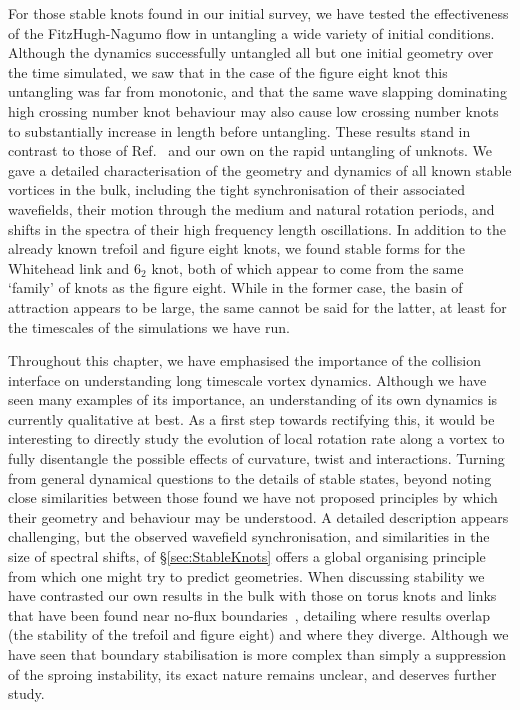 For those stable knots found in our initial survey, we have tested the effectiveness of the FitzHugh-Nagumo flow in untangling a wide variety of initial conditions. Although the dynamics successfully untangled all but one initial geometry over the time simulated, we saw that in the case of the figure eight knot this untangling was far from monotonic, and that the same wave slapping dominating high crossing number knot behaviour may also cause low crossing number knots to substantially increase in length before untangling. These results stand in contrast to those of Ref.~\citep{Maucher2016} and our own on the rapid untangling of unknots. We gave a detailed characterisation of the geometry and dynamics of all known stable vortices in the bulk, including the tight synchronisation of their associated wavefields, their motion through the medium and natural rotation periods, and shifts in the spectra of their high frequency length oscillations. In addition to the already known trefoil and figure eight knots, we found stable forms for the Whitehead link and $6_2$ knot, both of which appear to come from the same `family' of knots as the figure eight. While in the former case, the basin of attraction appears to be large, the same cannot be said for the latter, at least for the timescales of the simulations we have run. 

Throughout this chapter, we have emphasised the importance of the collision interface on understanding long timescale vortex dynamics. Although we have seen many examples of its importance, an understanding of its own dynamics is currently qualitative at best. As a first step towards rectifying this, it would be interesting to directly study the evolution of local rotation rate along a vortex to fully disentangle the possible effects of curvature, twist and interactions. Turning from general dynamical questions to the details of stable states, beyond noting close similarities between those found we have not proposed principles by which their geometry and behaviour may be understood. A detailed description appears challenging, but the observed wavefield synchronisation, and similarities in the size of spectral shifts, of \S\ref{sec:StableKnots} offers a global organising principle from which one might try to predict geometries. When discussing stability we have contrasted our own results in the bulk with those on torus knots and links that have been found near no-flux boundaries~\citep{Maucher2017,Maucher2019}, detailing where results overlap (the stability of the trefoil and figure eight) and where they diverge. Although we have seen that boundary stabilisation is more complex than simply a suppression of the sproing instability, its exact nature remains unclear, and deserves further study. 

